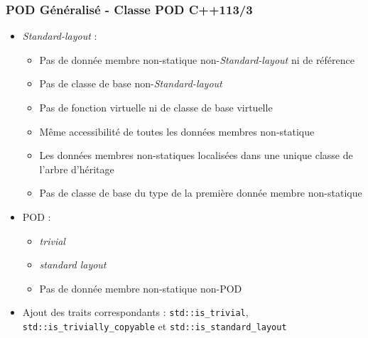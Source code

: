 \documentclass[C++.tex]{subfiles}
\begin{document}
\begin{frame}[fragile]
	\frametitle{POD Généralisé - Classe POD C++11\titlehfill{}3/3}
	\begin{itemize}
		\item \textit{Standard-layout} :
		\begin{itemize}
			\item Pas de donnée membre non-statique non-\textit{Standard-layout} ni de référence
			\item Pas de classe de base non-\textit{Standard-layout}
			\item Pas de fonction virtuelle ni de classe de base virtuelle
			\item Même accessibilité de toutes les données membres non-statique


			\item Les données membres non-statiques localisées dans une unique classe de l'arbre d'héritage


			\item Pas de classe de base du type de la première donnée membre non-statique


		\end{itemize}
		\item POD :
		\begin{itemize}
			\item \textit{trivial}
			\item \textit{standard layout}
			\item Pas de donnée membre non-statique non-POD
		\end{itemize}
		\item Ajout des traits correspondants : \lstinline|std::is_trivial|, \lstinline|std::is_trivially_copyable| et \lstinline|std::is_standard_layout|
	\end{itemize}
\end{frame}
\end{document}
